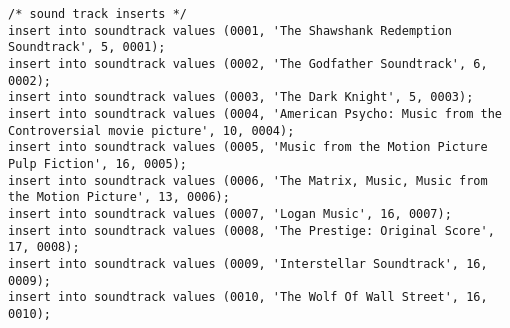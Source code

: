 \documentclass[12pt]{article}
\begin{document}
\begin{lstlisting}
/* sound track inserts */
insert into soundtrack values (0001, 'The Shawshank Redemption Soundtrack', 5, 0001);
insert into soundtrack values (0002, 'The Godfather Soundtrack', 6, 0002);
insert into soundtrack values (0003, 'The Dark Knight', 5, 0003);
insert into soundtrack values (0004, 'American Psycho: Music from the Controversial movie picture', 10, 0004);
insert into soundtrack values (0005, 'Music from the Motion Picture Pulp Fiction', 16, 0005);
insert into soundtrack values (0006, 'The Matrix, Music, Music from the Motion Picture', 13, 0006);
insert into soundtrack values (0007, 'Logan Music', 16, 0007);
insert into soundtrack values (0008, 'The Prestige: Original Score', 17, 0008);
insert into soundtrack values (0009, 'Interstellar Soundtrack', 16, 0009);
insert into soundtrack values (0010, 'The Wolf Of Wall Street', 16, 0010);


\end{lstlisting}
\end{document}
